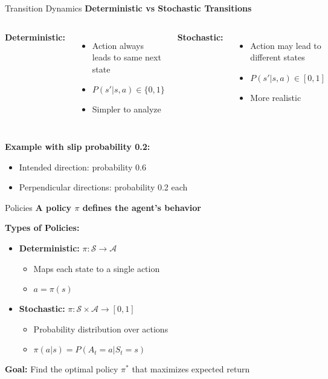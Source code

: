 \documentclass[aspectratio=169,10pt]{beamer}
\begin{document}
\begin{frame}{Transition Dynamics}
\textbf{Deterministic vs Stochastic Transitions}

\begin{columns}
\textbf{Deterministic:}
\begin{itemize}
    \item Action always leads to same next state
    \item $P(s' | s, a) \in \{0, 1\}$
    \item Simpler to analyze
\end{itemize}

\textbf{Stochastic:}
\begin{itemize}
    \item Action may lead to different states
    \item $P(s' | s, a) \in [0, 1]$
    \item More realistic
\end{itemize}
\end{columns}

\vspace{0.5cm}
\textbf{Example with slip probability 0.2:}
\begin{itemize}
    \item Intended direction: probability 0.6
    \item Perpendicular directions: probability 0.2 each
\end{itemize}
\end{frame}

\begin{frame}{Policies}
\textbf{A policy $\pi$ defines the agent's behavior}

\vspace{0.5cm}
\textbf{Types of Policies:}
\begin{itemize}
    \item \textbf{Deterministic:} $\pi: \mathcal{S} \rightarrow \mathcal{A}$
    \begin{itemize}
        \item Maps each state to a single action
        \item $a = \pi(s)$
    \end{itemize}
    \item \textbf{Stochastic:} $\pi: \mathcal{S} \times \mathcal{A} \rightarrow [0, 1]$
    \begin{itemize}
        \item Probability distribution over actions
        \item $\pi(a|s) = P(A_t = a | S_t = s)$
    \end{itemize}
\end{itemize}

\vspace{0.5cm}
\textbf{Goal:} Find the optimal policy $\pi^*$ that maximizes expected return
\end{frame}
\end{document}
